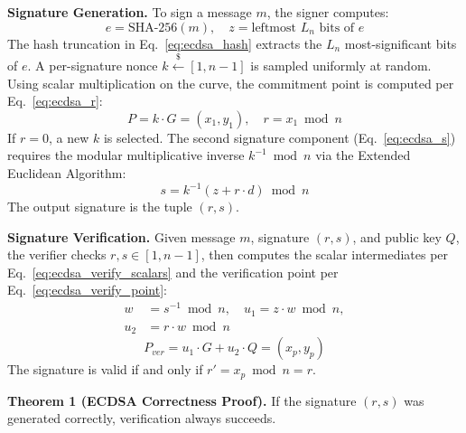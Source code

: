 \documentclass[journal, 10pt, twocolumn]{IEEEtran}
\begin{document}
\textbf{Signature Generation.} To sign a message $m$, the signer computes:
\begin{equation}
e = \text{SHA-256}(m), \quad z = \text{leftmost } L_n \text{ bits of } e
\label{eq:ecdsa_hash}
\end{equation}
The hash truncation in Eq.~\eqref{eq:ecdsa_hash} extracts the $L_n$ most-significant bits of $e$. A per-signature nonce $k \xleftarrow{\$} [1, n-1]$ is sampled uniformly at random. Using scalar multiplication on the curve, the commitment point is computed per Eq.~\eqref{eq:ecdsa_r}:
\begin{equation}
P = k \cdot G = (x_1, y_1), \quad r = x_1 \bmod n
\label{eq:ecdsa_r}
\end{equation}
If $r = 0$, a new $k$ is selected. The second signature component (Eq.~\eqref{eq:ecdsa_s}) requires the modular multiplicative inverse $k^{-1} \bmod n$ via the Extended Euclidean Algorithm:
\begin{equation}
s = k^{-1}(z + r \cdot d) \bmod n
\label{eq:ecdsa_s}
\end{equation}
The output signature is the tuple $(r, s)$.

\textbf{Signature Verification.} Given message $m$, signature $(r, s)$, and public key $Q$, the verifier checks $r, s \in [1, n-1]$, then computes the scalar intermediates per Eq.~\eqref{eq:ecdsa_verify_scalars} and the verification point per Eq.~\eqref{eq:ecdsa_verify_point}:
\begin{equation}
\begin{split}
w &= s^{-1} \bmod n, \quad u_1 = z \cdot w \bmod n, \\
u_2 &= r \cdot w \bmod n
\end{split}
\label{eq:ecdsa_verify_scalars}
\end{equation}
\begin{equation}
P_{ver} = u_1 \cdot G + u_2 \cdot Q = (x_p, y_p)
\label{eq:ecdsa_verify_point}
\end{equation}
The signature is valid if and only if $r' = x_p \bmod n = r$.

\textbf{Theorem 1 (ECDSA Correctness Proof).} If the signature $(r,s)$ was generated correctly, verification always succeeds.
\end{document}
